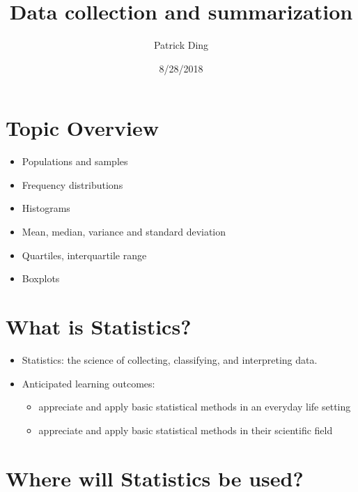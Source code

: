 \documentclass[]{tufte-handout}
\title{Data collection and summarization}
\author{Patrick Ding}
\date{8/28/2018}
\providecommand{\tightlist}{%
  \setlength{\itemsep}{0pt}\setlength{\parskip}{0pt}}
\begin{document}
\maketitle




\section{Topic Overview}\label{topic-overview}

\begin{itemize}
\tightlist
\item
  Populations and samples
\item
  Frequency distributions
\item
  Histograms
\item
  Mean, median, variance and standard deviation
\item
  Quartiles, interquartile range
\item
  Boxplots
\end{itemize}

\section{What is Statistics?}\label{what-is-statistics}

\begin{itemize}
\item
  Statistics: the science of collecting, classifying, and interpreting
  data.
\item
  Anticipated learning outcomes:

  \begin{itemize}
  \tightlist
  \item
    appreciate and apply basic statistical methods in an everyday life
    setting
  \item
    appreciate and apply basic statistical methods in their scientific
    field
  \end{itemize}
\end{itemize}

\section{Where will Statistics be
used?}\label{where-will-statistics-be-used}
\end{document}
